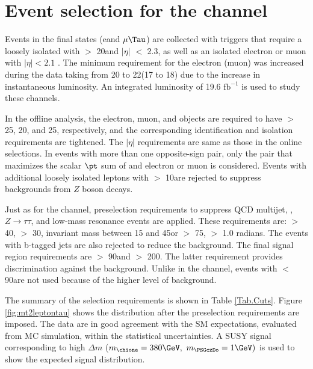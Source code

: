 \section{\texorpdfstring{Event selection for the \leptonTau channel}{Event selection for the lepton-tau channel}}
\label{sect:eleTauCuts}
Events in the \leptonTau final states (e\Tau and $\mu\Tau$)
are collected with triggers that require 
a loosely isolated \Tau with \PT $>$ 20\GeV and $|\eta|$ $<$ 2.3, as well as
an isolated electron or muon with $|\eta| < 2.1$ \cite{Chatrchyan:2011nv,Khachatryan:2015hwa,Chatrchyan:2012xi}.  The minimum
\PT requirement for the electron (muon) was increased during the data taking from 20 to 22\GeV (17 to 18\GeV)
due to the increase in instantaneous luminosity. An integrated luminosity of 19.6 $\mathrm{fb}^{-1}$ is used to study these channels.

In the offline analysis, the electron, muon, and \Tau objects are required to have \PT $>$ 25, 20, and 25\GeV, respectively, 
and the corresponding identification and isolation requirements are tightened. The $|\eta|$ requirements are same as those in the online selections.
In events with more than one opposite-sign \leptonTau pair, only 
 the pair that maximizes the scalar $\pt$ sum of \Tau and electron or muon is considered.  Events with additional loosely isolated leptons
with \PT $>$ 10\GeV are rejected to suppress backgrounds from $Z$ boson
decays.  

Just as for the \tauTau channel, preselection requirements to suppress
QCD multijet, \ttbar, $Z \to \tau \tau$, and low-mass resonance events are applied.
These requirements are: \mttwo $>$ 40\GeV, \MPT $>$ 30\GeV, \leptonTau 
invariant mass between 15 and 45\GeV or $>$ 75\GeV, \deltaphi $>$ 1.0 radians. The events with b-tagged jets are also rejected to reduce the 
\ttbar background.
 The final signal region requirements are \mttwo $>$ 90\GeV and \tauMT $>$ 200\GeV. %
The latter requirement provides discrimination against the \wjets background.  Unlike in the \tauTau channel,
events with \mttwo $<$ 90\GeV are not used because of the higher 
level of background. 

The summary of the selection requirements is shown in Table \ref{Tab.Cuts}.
Figure \ref{fig:mt2leptontau} %
shows the \mttwo distribution after the preselection requirements are imposed. 
The data are in good agreement with the SM expectations, evaluated from MC simulation, within the statistical uncertainties. 
A SUSY signal corresponding to high $\Delta m$ ($m_{\chione}=380\GeV,~m_{\PSGczDo}=1\GeV)$ is used to show the expected signal distribution.

